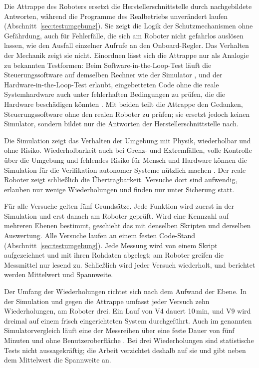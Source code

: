 Die Attrappe des Roboters ersetzt die Herstellerschnittstelle durch nachgebildete Antworten, während die Programme des Realbetriebs unverändert laufen (Abschnitt~\ref{sec:testumgebung}).
Sie zeigt die Logik der Schutzmechanismen ohne Gefährdung, auch für Fehlerfälle, die sich am Roboter nicht gefahrlos auslösen lassen, wie den Ausfall einzelner Aufrufe an den Onboard-Regler.
Das Verhalten der Mechanik zeigt sie nicht.
Einordnen lässt sich die Attrappe nur als Analogie zu bekannten Testformen: Beim Software-in-the-Loop-Test läuft die Steuerungssoftware auf demselben Rechner wie der Simulator \cite{Afzal2021}, und der Hardware-in-the-Loop-Test erlaubt, eingebetteten Code ohne die reale Systemhardware auch unter fehlerhaften Bedingungen zu prüfen, die die Hardware beschädigen könnten \cite{Mihalic2022}.
Mit beiden teilt die Attrappe den Gedanken, Steuerungssoftware ohne den realen Roboter zu prüfen; sie ersetzt jedoch keinen Simulator, sondern bildet nur die Antworten der Herstellerschnittstelle nach.

Die Simulation zeigt das Verhalten der Umgebung mit Physik, wiederholbar und ohne Risiko.
Wiederholbarkeit auch bei Grenz- und Extremfällen, volle Kontrolle über die Umgebung und fehlendes Risiko für Mensch und Hardware können die Simulation für die Verifikation autonomer Systeme nützlich machen \cite{Choi2021}.
Der reale Roboter zeigt schließlich die Übertragbarkeit.
Versuche dort sind aufwendig, erlauben nur wenige Wiederholungen und finden nur unter Sicherung statt.

Für alle Versuche gelten fünf Grundsätze.
Jede Funktion wird zuerst in der Simulation und erst danach am Roboter geprüft.
Wird eine Kennzahl auf mehreren Ebenen bestimmt, geschieht das mit denselben Skripten und derselben Auswertung.
Alle Versuche laufen an einem festen Code-Stand (Abschnitt~\ref{sec:testumgebung}).
Jede Messung wird von einem Skript aufgezeichnet und mit ihren Rohdaten abgelegt; am Roboter greifen die Messmittel nur lesend zu.
Schließlich wird jeder Versuch wiederholt, und berichtet werden Mittelwert und Spannweite.

Der Umfang der Wiederholungen richtet sich nach dem Aufwand der Ebene.
In der Simulation und gegen die Attrappe umfasst jeder Versuch zehn Wiederholungen, am Roboter drei.
Ein Lauf von V4 dauert 10\,min, und V9 wird dreimal auf einem frisch eingerichteten System durchgeführt.
Auch im genannten Simulatorvergleich läuft eine der Messreihen über eine feste Dauer von fünf Minuten und ohne Benutzeroberfläche \cite{Pitonakova2018}.
Bei drei Wiederholungen sind statistische Tests nicht aussagekräftig; die Arbeit verzichtet deshalb auf sie und gibt neben dem Mittelwert die Spannweite an.

